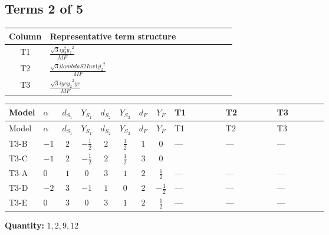 \documentclass[8pt]{article}
\begin{document}
\begin{landscape}
\subsection*{Terms 2 of 5}
\begin{center}
\begin{tabular}{@{}c >{\raggedright\arraybackslash}p{0.82\linewidth}@{}}
\toprule
Column & Representative term structure \\
\midrule
T1 & \(\displaystyle \frac{\sqrt{3} i g_{2}^{2} \overline{y_{2}}^{2}}{MF}\) \\
\midrule
T2 & \(\displaystyle \frac{\sqrt{3} i lambdaS2Inv1 \overline{y_{2}}^{2}}{MF}\) \\
\midrule
T3 & \(\displaystyle \frac{\sqrt{3} i ye \overline{y_{2}}^{2} \overline{ye}}{MF}\) \\
\midrule
\bottomrule
\end{tabular}
\end{center}
\smallskip
\tiny
\begin{longtable}{@{}llcccccc >{\raggedright\arraybackslash}p{0.21\linewidth} >{\raggedright\arraybackslash}p{0.21\linewidth} >{\raggedright\arraybackslash}p{0.21\linewidth}@{}}
\toprule
Model & $\alpha$ & $d_{S_1}$ & $Y_{S_1}$ & $d_{S_2}$ & $Y_{S_2}$ & $d_F$ & $Y_F$ & T1 & T2 & T3 \\
\midrule
\endfirsthead
\toprule
Model & $\alpha$ & $d_{S_1}$ & $Y_{S_1}$ & $d_{S_2}$ & $Y_{S_2}$ & $d_F$ & $Y_F$ & T1 & T2 & T3 \\
\midrule
\endhead
T3-B & $-1$ & $2$ & $-\frac{1}{2}$ & $2$ & $\frac{1}{2}$ & $1$ & $0$ & --- & --- & --- \\
\midrule
T3-C & $-1$ & $2$ & $-\frac{1}{2}$ & $2$ & $\frac{1}{2}$ & $3$ & $0$ & \scriptsize\adjustbox{max width=\linewidth}{$\begin{gathered} \frac{\sqrt{3} i g_{2}^{2} \overline{y_{2}}^{2}}{8 MF}\end{gathered}$} & \scriptsize\adjustbox{max width=\linewidth}{$\begin{gathered} \frac{\sqrt{3} i lambdaS2Inv1 \overline{y_{2}}^{2}}{12 MF}\end{gathered}$} & \scriptsize\adjustbox{max width=\linewidth}{$\begin{gathered} - \frac{\sqrt{3} i ye \overline{y_{2}}^{2} \overline{ye}}{24 MF}\end{gathered}$} \\
\midrule
T3-A & $0$ & $1$ & $0$ & $3$ & $1$ & $2$ & $\frac{1}{2}$ & --- & --- & --- \\
\midrule
T3-D & $-2$ & $3$ & $-1$ & $1$ & $0$ & $2$ & $-\frac{1}{2}$ & --- & --- & --- \\
\midrule
T3-E & $0$ & $3$ & $0$ & $3$ & $1$ & $2$ & $\frac{1}{2}$ & --- & --- & --- \\
\midrule
\bottomrule
\end{longtable}
\clearpage
\noindent\textbf{Quantity: }$\mathrm{1,2,9,12}$\par\smallskip

\end{landscape}
\end{document}
